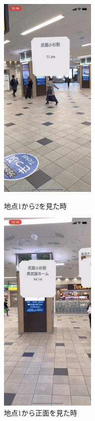 \begin{figure}[H]
  \begin{minipage}{0.5\hsize}
    \centering
    \includegraphics[height=100mm]{images/musako_tokyu_ar1.png}
    \caption{地点\textcircled{\scriptsize{1}}から\textcircled{\scriptsize{2}}を見た時} \label{fig:musako_tokyu_ar1}
  \end{minipage}
  \begin{minipage}{0.5\hsize}
    \centering
    \includegraphics[height=100mm]{images/musako_tokyu_ar2.png}
    \caption{地点\textcircled{\scriptsize{1}}から正面を見た時} \label{fig:musako_tokyu_ar2}
  \end{minipage}
\end{figure}

